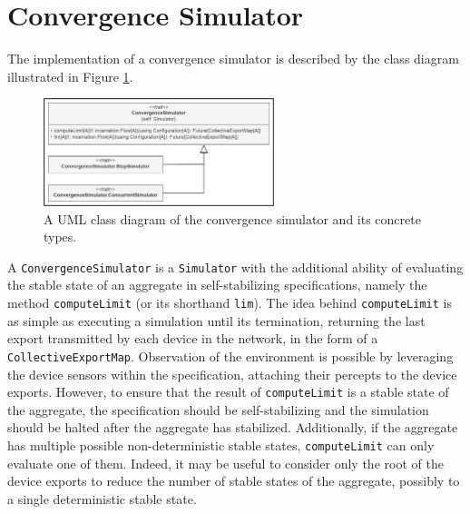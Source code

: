 
\section{Convergence Simulator}
\label{section:implementation:convergence-simulator}

The implementation of a convergence simulator is described by the class diagram
illustrated in Figure \ref{figure:convergence-simulator-class-diagram}.

\begin{figure}[!ht]
  \centering
  \includegraphics[width=0.60\textwidth]{resources/figures/convergence-simulator-class-diagram.png}
  \caption[A UML class diagram of the convergence simulator]{
    A UML class diagram of the convergence simulator
    and its concrete types.
  }
  \label{figure:convergence-simulator-class-diagram}
\end{figure}

A \texttt{ConvergenceSimulator} is a \texttt{Simulator} with the additional
ability of evaluating the stable state of an aggregate in self-stabilizing
specifications, namely the method \texttt{computeLimit} (or its shorthand
\texttt{lim}). The idea behind \texttt{computeLimit} is as simple as executing
a simulation until its termination, returning the last export transmitted by
each device in the network, in the form of a \texttt{CollectiveExportMap}.
Observation of the environment is possible by leveraging the device sensors
within the specification, attaching their percepts to the device exports.
However, to ensure that the result of \texttt{computeLimit} is a stable state
of the aggregate, the specification should be self-stabilizing and the
simulation should be halted after the aggregate has stabilized. Additionally,
if the aggregate has multiple possible non-deterministic stable states,
\texttt{computeLimit} can only evaluate one of them. Indeed, it may be useful
to consider only the root of the device exports to reduce the number of stable
states of the aggregate, possibly to a single deterministic stable state.

